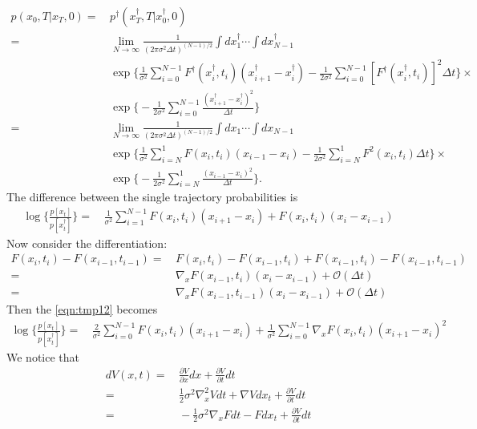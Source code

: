 \documentclass[preprint,unsortedaddress,a4paper,onecolumn]{revtex4-1}
\newcommand{\mo}[0]{\mathcal {O}}
\newcommand{\dt}[0]{\Delta t}
\begin{document}
\begin{align}\nonumber
  p(x_0,T\vert x_T,0) = &\,
  p^\dagger(x^\dagger_T,T\vert x^\dagger_0,0)  \\\nonumber
  = &\,
  \lim_{N\rightarrow\infty}
  \frac{1}{(2\pi\sigma^2\dt)^{(N-1)/2}} \int dx^\dagger_1\cdots\int dx^\dagger_{N-1}\\\nonumber
  &\,
  \exp\bigg\{\frac1{\sigma^2}\sum_{i=0}^{N-1} F^\dagger(x^\dagger_{i},t_{i})(x^\dagger_{i+1} - x^\dagger_i) -\frac1{2\sigma^2}\sum_{i=0}^{N-1}[F^\dagger(x^\dagger_i,t_i)]^2\dt\bigg\} \times\\\nonumber
  &\,
  \exp\bigg\{- \frac1{2\sigma^2} \sum_{i=0}^{N-1} \frac{(x^\dagger_{i+1} - x^\dagger_i)^2}{\dt}\bigg\} \\\nonumber
  =&\,
  \lim_{N\rightarrow\infty} 
  \frac{1}{(2\pi\sigma^2\dt)^{(N-1)/2}} \int dx_1\cdots\int dx_{N-1}\\\nonumber
  &\,
  \exp\bigg\{\frac1{\sigma^2}\sum_{i=N}^{1} F(x_{i},t_{i})(x_{i-1} - x_i) -\frac1{2\sigma^2}\sum_{i=N}^{1}F^2(x_i,t_i)\dt\bigg\} \times\\\label{eqn:tmp11}
  &\,
  \exp\bigg\{- \frac1{2\sigma^2} \sum_{i=N}^{1} \frac{(x_{i-1} - x_i)^2}{\dt}\bigg\}.
\end{align}
The difference between the single trajectory probabilities is
\begin{align}\label{eqn:tmp12}
  \log\bigg\{\frac{  p[x_t] }{ p[x^\dagger_t]} \bigg\}
  =&\,
  \frac1{\sigma^2}\sum_{i=1}^{N-1} F(x_i,t_i)(x_{i+1} - x_{i}) + F(x_i,t_i)(x_{i} - x_{i-1}) 
\end{align}
Now consider the differentiation:
\begin{align}\nonumber
  F(x_{i},t_{i}) - F(x_{i-1},t_{i-1}) =
  &\,
  F(x_{i},t_{i}) - F(x_{i-1},t_{i}) + F(x_{i-1},t_{i}) -  F(x_{i-1},t_{i-1})\\\nonumber
  =&\,
  \nabla_x F(x_{i-1},t_{i})(x_i - x_{i-1}) + \mo(\dt) \\\label{eqn:tmp13}
  =&\,
  \nabla_x F(x_{i-1},t_{i-1})(x_i - x_{i-1}) + \mo(\dt)
\end{align}
Then the \eqref{eqn:tmp12} becomes
\begin{align}\label{eqn:tmp14}
  \log\bigg\{\frac{  p[x_t] }{ p[x^\dagger_t]} \bigg\}
  =&\,
  \frac2{\sigma^2}\sum_{i=0}^{N-1} F(x_i,t_i)(x_{i+1} - x_{i}) +
  \frac1{\sigma^2}\sum_{i=0}^{N-1}\nabla_xF(x_i,t_i)(x_{i+1} - x_{i})^2
\end{align}
We notice that
\begin{align}\nonumber
  dV(x, t) = &\, \frac{\partial V}{\partial x} dx + \frac{\partial V}{\partial t} dt\\\nonumber
  =&\,
  \frac12 \sigma^2 \nabla^2_x V dt +  \nabla V dx_t + \frac{\partial V}{\partial t} dt \\
  =&\,
  -\frac12 \sigma^2 \nabla_x F dt -  F dx_t + \frac{\partial V}{\partial t} dt
\end{align}
\end{document}
